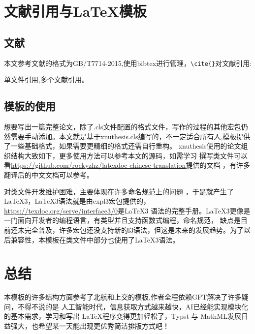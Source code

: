 \section{文献引用与\LaTeX 模板}
\subsection{文献}
本文参考文献的格式为GB/T7714-2015,使用bibtex进行管理，\verb|\cite{}|对文献引用:
\begin{center}

单文件引用\cite{Cheng1999},多个文献引用\cite{CSTAM1990,GBT2659,HBLZ2001,Hopkinson1999,Jiang1989,Jiang1998,Li2000,Li1999,LSC1957,WHO1970,Yu2001,Zhang1998}。
    
\end{center}
\subsection{模板的使用}
想要写出一篇完整论文，除了.cls文件配置的格式文件，写作的过程的其他宏包仍然需要手动添加。本文就是基于xnuthesis.cls编写的，不一定适合所有人,模板提供了一些基础格式，如果需要更精细的格式还需自行重构。
xnuthesis使用的论文组织结构大致如下，更多使用方法可以参考本文的源码，如需学习
撰写类文件可以看\url{https://github.com/rockyzhz/latexdoc-chinese-translation}提供的文档 ，有许多翻译后的中文文档可以参考。

\begin{figure}[p]
\centering

\end{figure}

\LaTeXe{}对类文件开发维护困难，主要体现在许多命名规范上的问题 ，于是就产生了\LaTeX 3，\LaTeX 3语法就是由expl3宏包提供的，\url{https://texdoc.org/serve/interface3/0}是\LaTeX 3 语法的完整手册。\LaTeX 3更像是一门面向开发者的编程语言，有类型并且支持函数式编程，命名规范，
缺点是目前还未完全普及，许多宏包还没支持新的l3语法，但这是未来的发展趋势。为了以后兼容性，本模板在类文件中部分也使用了\LaTeX3语法。

\section{总结}
本模板的许多结构方面参考了北航和上交的模板,作者全程依赖GPT解决了许多疑问，不得不说的是
人工智能时代，信息获取方式越来越快，AI已经能实现模块化的基本需求，学习和写出 \LaTeX 程序变得更加轻松了，Typst 与 MathML发展日益强大，也希望某一天能出现更优秀简洁排版方式吧！

\newpage

